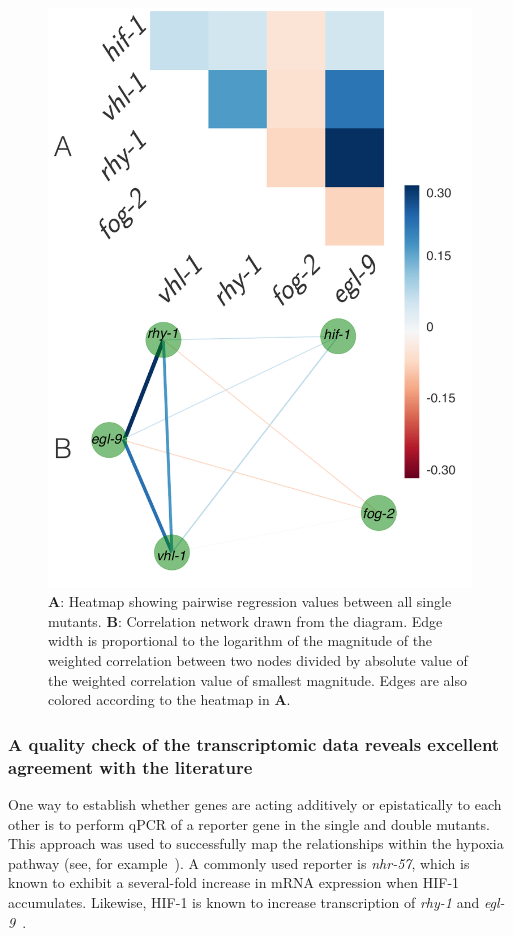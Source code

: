 \documentclass[9pt,twocolumn,twoside]{pnas-new}
\newcommand{\gene}[1]{\emph{#1}}
\newcommand{\nhr}{\emph{nhr-57}}
\newcommand{\hifp}{HIF-1}
\begin{document}
\begin{figure}[tbhp]
\centering
\includegraphics[width=\linewidth]{figs/bayesian_heat_map.pdf}
\caption{
\textbf{A}: Heatmap showing pairwise regression values between all
single mutants. \textbf{B}: Correlation network drawn from the diagram. Edge
width is proportional to the logarithm of the magnitude of the weighted
correlation between two nodes divided by absolute value of the weighted
correlation value of smallest magnitude. Edges are also colored according to the
heatmap in \textbf{A}.
}
\label{fig:heatmap}
\end{figure}

\subsubsection*{A quality check of the transcriptomic data reveals excellent agreement
            with the literature}
\label{sub:quality_check}
One way to establish whether genes are acting additively or epistatically to each
other is to perform qPCR of a reporter gene in the single and double mutants. This
approach was used to successfully map the relationships within the hypoxia
pathway (see, for example~\cite{Shao2009,Shen2006}). A commonly used reporter is
\nhr{}, which is known to exhibit a several-fold increase in mRNA expression when
\hifp{} accumulates\cite{Shen2006,Shen2005,Ackerman2012,
Park2012}. Likewise, \hifp{} is known to increase transcription of \gene{rhy-1}
and \gene{egl-9}~\cite{Powell-Coffman2010}.
\end{document}
